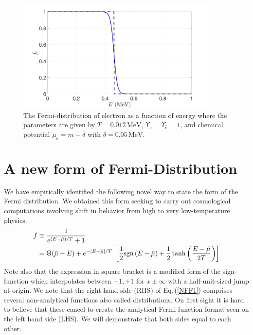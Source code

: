 \documentclass[sn-mathphys,Numbered]{sn-jnl}
\theoremstyle{thmstyleone}%
\theoremstyle{thmstyletwo}%
\theoremstyle{thmstylethree}%
\begin{document}
\begin{figure}[h]
\begin{center}
\includegraphics[width=0.9\textwidth]{./plot/Electron_distribution001}
\caption{The Fermi-distribution of electron as a function of energy where the parameters are given by $T=0.012\,\mathrm{MeV}$, $\Upsilon_e=\Upsilon_{\bar e}=1$, and chemical potential $\mu_e=m-\delta$ with $\delta=0.05\,\mathrm{MeV}$.}
\label{Electron_001}
\end{center}
\end{figure}




\section{A new form of Fermi-Distribution}\label{NewFermi}

We have empirically identified the following novel way to state the form of the Fermi distribution. We obtained this form seeking to carry out cosmological computations involving shift in behavior from high to very low-temperature physics. 
\begin{align}\label{NFF1}
f&\equiv \frac{1}{e^{ (E-\tilde\mu)/T} +1}\notag\\
&=\Theta(\tilde\mu - E) +  e^{ - |E-\tilde\mu|/T }
\; \left[\frac{1}{2}\mathrm{sgn}\left({E-\tilde\mu}\right) 
 +\frac{1}{2}\tanh\left(\frac{E-\tilde\mu}{2T}\right)\right]
\end{align}
Note also that the expression in square bracket is a modified form of the sign-function which interpolates between $-1,+1$ for $x\pm \infty$ with a half-unit-sized jump at origin.  We note  that the right hand side (RHS) of Eq.\,(\ref{NFF1}) comprises several non-analytical functions also called distributions. On first sight it is hard to believe that  these   cancel to create the analytical Fermi function format seen on the left hand side (LHS). We will demonstrate that both sides equal to each other.
\end{document}
